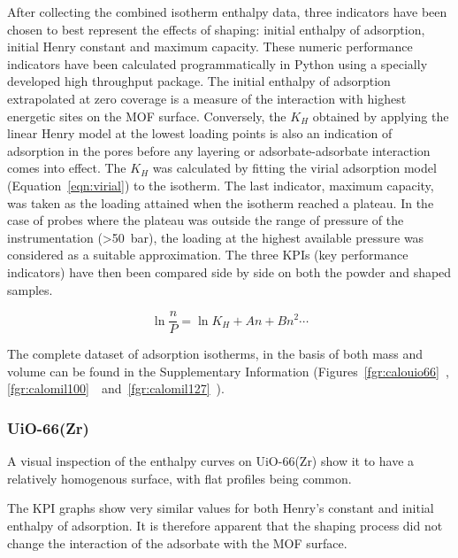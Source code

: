 After collecting the combined isotherm enthalpy data, three indicators have been chosen
to best represent the effects of shaping: initial enthalpy of adsorption, initial 
Henry constant and maximum capacity. These numeric performance indicators have been
calculated programmatically in Python using a specially developed high throughput
package.
The initial enthalpy of adsorption extrapolated at zero coverage is a measure of the 
interaction with highest energetic sites on the MOF surface. Conversely, the 
\(K_H\) obtained by applying the linear Henry model at the lowest loading points
is also an indication of adsorption in the pores before any 
layering or adsorbate-adsorbate interaction comes into effect. The \(K_H\) was 
calculated by fitting the virial adsorption model (Equation~\ref{eqn:virial})
to the isotherm.
The last indicator, maximum capacity, was taken as the loading attained when 
the isotherm reached a plateau. In the case of probes where the plateau was outside 
the range of pressure of the instrumentation (>\SI{50}{\bar}), the loading at the 
highest available pressure was considered as a suitable approximation.
The three KPIs (key performance indicators) have then been compared side by 
side on both the powder and shaped samples. 

\begin{equation}
    \label{eqn:virial}
    \ln{\frac{n}{P}} = \ln{K_H} + An + Bn^2 \cdots
\end{equation}

The complete dataset of adsorption isotherms, in the basis of both mass and volume 
can be found in the Supplementary Information (Figures~\ref*{fgr:calouio66}~,
\ref*{fgr:calomil100}~~and~\ref*{fgr:calomil127}~).

\subsubsection{UiO-66(Zr)}

A visual inspection of the enthalpy curves on UiO-66(Zr) show it to have a 
relatively homogenous surface, with flat profiles being common.

The KPI graphs show very similar values for both Henry's constant and initial 
enthalpy of adsorption. It is therefore apparent that the shaping process did not 
change the interaction of the adsorbate with the MOF surface.

